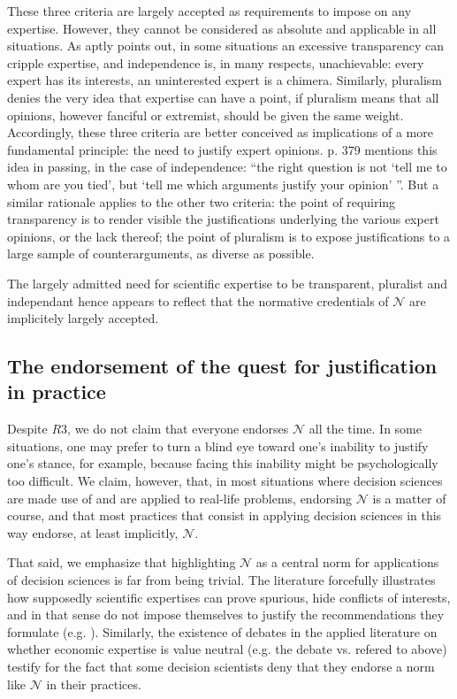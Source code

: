 \documentclass[preprint, french, english, 11pt, authoryear]{elsarticle}%
\newcommand{\adv}{\mathscr{N}}
\begin{document}
These three criteria are largely accepted as requirements to impose on any expertise. However, they cannot be considered as absolute and applicable in all situations. As \citet{godard_environnement_2015} aptly points out, in some situations an excessive transparency can cripple expertise, and independence is, in many respects, unachievable: every expert has its interests, an uninterested expert is a chimera. Similarly, pluralism denies the very idea that expertise can have a point, if pluralism means that all opinions, however fanciful or extremist, should be given the same weight. Accordingly, these three criteria are better conceived as implications of a more fundamental principle: the need to justify expert opinions. \citet{godard_environnement_2015} p. 379 mentions this idea in passing, in the case of independence: ``the right question is not `tell me to whom are you tied', but `tell me which arguments justify your opinion' ''. But a similar rationale applies to the other two criteria: the point of requiring transparency is to render visible the justifications underlying the various expert opinions, or the lack thereof; the point of pluralism is to expose justifications to a large sample of counterarguments, as diverse as possible.

The largely admitted need for scientific expertise to be transparent, pluralist and independant hence appears to reflect that the normative credentials of $\adv$ are implicitely largely accepted. 

\subsection{The endorsement of the quest for justification in practice}
Despite $R3$, we do not claim that everyone endorses $\adv$ all the time. In some situations, one may prefer to turn a blind eye toward one's inability to justify one's stance, for example, because facing this inability might be psychologically too difficult. We claim, however, that, in most situations where decision sciences are made use of and are applied to real-life problems, endorsing $\adv$ is a matter of course, and that most practices that consist in applying decision sciences in this way endorse, at least implicitly, $\adv$.

That said, we emphasize that highlighting $\adv$ as a central norm for applications of decision sciences is far from being trivial. The literature forcefully illustrates how supposedly scientific expertises can prove spurious, hide conflicts of interests, and in that sense do not impose themselves to justify the recommendations they formulate (e.g. \citet{hoggan_climate_2009,oreskes_merchants_2011}). Similarly, the existence of debates in the applied literature on whether economic expertise is value neutral (e.g. the debate \citet{spash_bulldozing_2015} vs. \citet{scharks_dont_2016} refered to above) testify for the fact that some decision scientists deny that they endorse a norm like $\adv$ in their practices.
\end{document}
